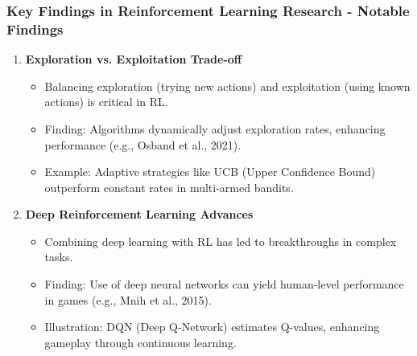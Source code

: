 \documentclass[aspectratio=169]{beamer}
\begin{document}
\begin{frame}[fragile]
    \frametitle{Key Findings in Reinforcement Learning Research - Notable Findings}
    \begin{enumerate}
        \item \textbf{Exploration vs. Exploitation Trade-off}
        \begin{itemize}
            \item Balancing exploration (trying new actions) and exploitation (using known actions) is critical in RL.
            \item Finding: Algorithms dynamically adjust exploration rates, enhancing performance (e.g., Osband et al., 2021).
            \item Example: Adaptive strategies like UCB (Upper Confidence Bound) outperform constant rates in multi-armed bandits.
        \end{itemize}
        
        \item \textbf{Deep Reinforcement Learning Advances}
        \begin{itemize}
            \item Combining deep learning with RL has led to breakthroughs in complex tasks.
            \item Finding: Use of deep neural networks can yield human-level performance in games (e.g., Mnih et al., 2015).
            \item Illustration: DQN (Deep Q-Network) estimates Q-values, enhancing gameplay through continuous learning.
        \end{itemize}
    \end{enumerate}
\end{frame}
\end{document}

